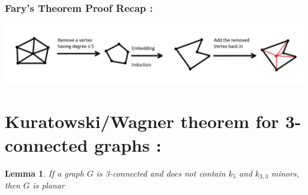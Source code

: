 \documentclass{article}
\newtheorem{lemma}{Lemma}
\begin{document}
    \subsubsection*{Fary's Theorem Proof Recap : }
    \centerline{\includegraphics[width=7in]{Images/Fary.jpg}} 
    \newpage
    \section*{Kuratowski/Wagner theorem for 3-connected graphs : }\begin{lemma}
        If a graph $G$ is 3-connected and does not contain $k_{5}$ and $k_{3,3}$ minors, then $G$ is planar 
    \end{lemma}
\end{document}
